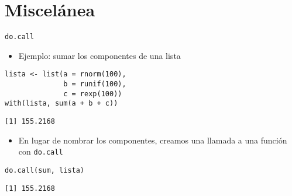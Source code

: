 \documentclass[xcolor={usenames,svgnames,dvipsnames}]{beamer}
\begin{document}
\section{Miscelánea}
\label{sec:orgheadline36}
\begin{frame}[fragile,label={sec:orgheadline31}]{\texttt{do.call}}
 \begin{itemize}
\item Ejemplo: sumar los componentes de una lista
\end{itemize}
\lstset{language=R,label= ,caption= ,captionpos=b,numbers=none}
\begin{lstlisting}
lista <- list(a = rnorm(100),
              b = runif(100),
              c = rexp(100))
with(lista, sum(a + b + c))
\end{lstlisting}

\begin{verbatim}
[1] 155.2168
\end{verbatim}

\begin{itemize}
\item En lugar de nombrar los componentes, creamos una llamada a una
función con \texttt{do.call}
\end{itemize}
\lstset{language=R,label= ,caption= ,captionpos=b,numbers=none}
\begin{lstlisting}
do.call(sum, lista)
\end{lstlisting}

\begin{verbatim}
[1] 155.2168
\end{verbatim}
\end{frame}
\end{document}
